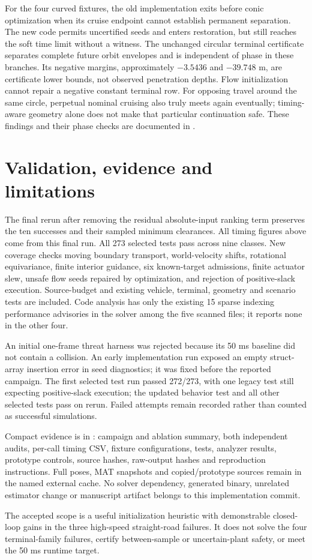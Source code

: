\documentclass[11pt]{article}
\begin{document}
For the four curved fixtures, the old implementation exits before conic
optimization when its cruise endpoint cannot establish permanent separation.
The new code permits uncertified seeds and enters restoration, but still
reaches the soft time limit without a witness. The unchanged circular
terminal certificate separates complete future orbit envelopes and is
independent of phase in these branches. Its negative margins, approximately
$-3.5436$ and $-39.748$ m, are certificate lower bounds, not observed penetration
depths. Flow initialization cannot repair a negative constant terminal row.
For opposing travel around the same circle, perpetual nominal cruising also
truly meets again eventually; timing-aware geometry alone does not make that
particular continuation safe. These findings and their phase checks are
documented in .

\section{Validation, evidence and limitations}
The final rerun after removing the residual absolute-input ranking term
preserves the ten successes and their sampled minimum clearances. All timing
figures above come from this final run. All 273 selected tests pass across nine classes. New coverage checks moving
boundary transport, world-velocity shifts, rotational equivariance, finite
interior guidance, six known-target admissions, finite actuator slew, unsafe
flow seeds repaired by optimization, and rejection of positive-slack
execution. Source-budget and existing vehicle, terminal, geometry and
scenario tests are included. Code analysis has only the existing 15 sparse
indexing performance advisories in the solver among the five scanned files;
it reports none in the other four.

An initial one-frame threat harness was rejected because its 50 ms baseline
did not contain a collision. An early implementation run exposed an empty
struct-array insertion error in seed diagnostics; it was fixed before the
reported campaign. The first selected test run passed 272/273, with one
legacy test still expecting positive-slack execution; the updated behavior
test and all other selected tests pass on rerun. Failed attempts remain
recorded rather than counted as successful simulations.

Compact evidence is in :
campaign and ablation summary, both independent audits, per-call timing CSV,
fixture configurations, tests, analyzer results, prototype controls, source
hashes, raw-output hashes and reproduction instructions. Full poses, MAT
snapshots and copied/prototype sources remain in the named external cache.
No solver dependency, generated binary, unrelated estimator change or
manuscript artifact belongs to this implementation commit.

The accepted scope is a useful initialization heuristic with demonstrable
closed-loop gains in the three high-speed straight-road failures. It does
not solve the four terminal-family failures, certify between-sample or
uncertain-plant safety, or meet the 50 ms runtime target.
\end{document}
